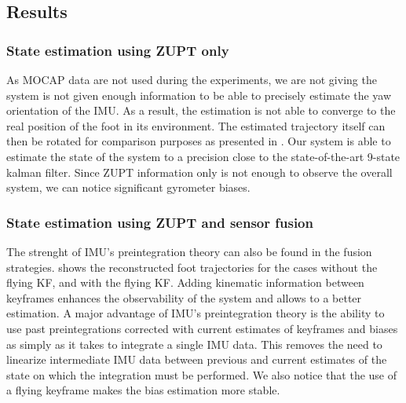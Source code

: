 %

\subsection{Results}
\subsubsection{State estimation using ZUPT only}

As MOCAP data are not used during the experiments, we are not giving the system is not given enough information to be able to precisely estimate the yaw orientation of the IMU. 
As a result, the estimation is not able to converge to the real position of the foot in its environment. The estimated trajectory itself can then be rotated for comparison purposes as presented in .
Our system is able to estimate the state of the system to a precision close to the state-of-the-art 9-state kalman filter.
Since ZUPT information only is not enough to observe the overall system, we can notice significant gyrometer biases.

\subsubsection{State estimation using ZUPT and sensor fusion}

The strenght of IMU's preintegration theory can also be found in the fusion strategies. 
 shows the reconstructed foot trajectories for the cases without the flying KF, and with the flying KF. Adding kinematic information between keyframes enhances the observability of the system and allows to a better estimation.
A major advantage of IMU's preintegration theory is the ability to use past preintegrations corrected with current estimates of keyframes and biases as simply as it takes to integrate a single IMU data. This removes the need to linearize 
intermediate IMU data between previous and current estimates of the state on which the integration must be performed. We also notice that the use of a flying keyframe makes the bias estimation more stable.

